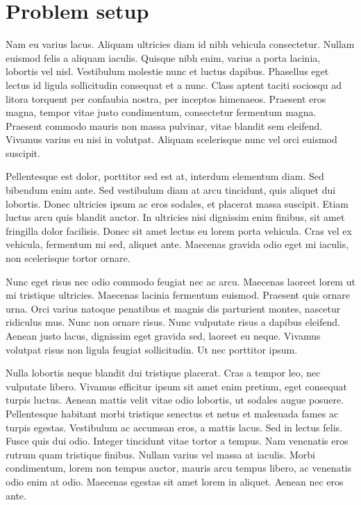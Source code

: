 \documentclass{article}
\begin{document}
\section{Problem setup}
Nam eu varius lacus. Aliquam ultricies diam id nibh vehicula consectetur. Nullam euismod felis a aliquam iaculis. Quisque nibh enim, varius a porta lacinia, lobortis vel nisl. Vestibulum molestie nunc et luctus dapibus. Phasellus eget lectus id ligula sollicitudin consequat et a nunc. Class aptent taciti sociosqu ad litora torquent per confaubia nostra, per inceptos himenaeos. Praesent eros magna, tempor vitae justo condimentum, consectetur fermentum magna. Praesent commodo mauris non massa pulvinar, vitae blandit sem eleifend. Vivamus varius eu nisi in volutpat. Aliquam scelerisque nunc vel orci euismod suscipit.

Pellentesque est dolor, porttitor sed est at, interdum elementum diam. Sed bibendum enim ante. Sed vestibulum diam at arcu tincidunt, quis aliquet dui lobortis. Donec ultricies ipsum ac eros sodales, et placerat massa suscipit. Etiam luctus arcu quis blandit auctor. In ultricies nisi dignissim enim finibus, sit amet fringilla dolor facilisis. Donec sit amet lectus eu lorem porta vehicula. Cras vel ex vehicula, fermentum mi sed, aliquet ante. Maecenas gravida odio eget mi iaculis, non scelerisque tortor ornare.

Nunc eget risus nec odio commodo feugiat nec ac arcu. Maecenas laoreet lorem ut mi tristique ultricies. Maecenas lacinia fermentum euismod. Praesent quis ornare urna. Orci varius natoque penatibus et magnis dis parturient montes, nascetur ridiculus mus. Nunc non ornare risus. Nunc vulputate risus a dapibus eleifend. Aenean justo lacus, dignissim eget gravida sed, laoreet eu neque. Vivamus volutpat risus non ligula feugiat sollicitudin. Ut nec porttitor ipsum.

Nulla lobortis neque blandit dui tristique placerat. Cras a tempor leo, nec vulputate libero. Vivamus efficitur ipsum sit amet enim pretium, eget consequat turpis luctus. Aenean mattis velit vitae odio lobortis, ut sodales augue posuere. Pellentesque habitant morbi tristique senectus et netus et malesuada fames ac turpis egestas. Vestibulum ac accumsan eros, a mattis lacus. Sed in lectus felis. Fusce quis dui odio. Integer tincidunt vitae tortor a tempus. Nam venenatis eros rutrum quam tristique finibus. Nullam varius vel massa at iaculis. Morbi condimentum, lorem non tempus auctor, mauris arcu tempus libero, ac venenatis odio enim at odio. Maecenas egestas sit amet lorem in aliquet. Aenean nec eros ante.
\end{document}
